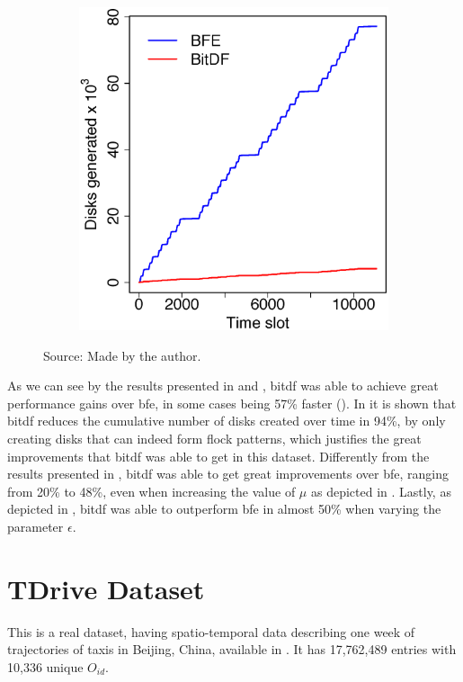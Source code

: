 {\begin{figure}[h!]
\begin{subfigure}[t]{0.48\textwidth}
        \includegraphics[width=\textwidth]{images/BerlinMOD_d.eps}
        \label{fig:berlinmod_disks}
    \end{subfigure}
    \footnotesize{Source: Made by the author.}
    \label{fig:berlinmod_results2}
\end{figure}

As we can see by the results presented in  and , \ac{bitdf}
was able to achieve great performance gains over \ac{bfe}, in some cases being 57\% faster
(). In  it is shown that \ac{bitdf} reduces the cumulative
number of disks created over time in 94\%, by only creating disks that can indeed form flock patterns, which justifies
the great improvements that \ac{bitdf} was able to get in this dataset. Differently from the results presented in
, \ac{bitdf} was able to get great improvements over \ac{bfe}, ranging from 20\% to 48\%, even when
increasing the value of $\mu$ as depicted in . Lastly, as depicted in
, \ac{bitdf} was able to outperform \ac{bfe} in almost 50\% when varying the parameter
$\epsilon$.

\section{TDrive Dataset}
\label{sec:tdrive}
This is a real dataset, having spatio-temporal data describing one week of trajectories of taxis in Beijing, China,
available in \citep{tdrive}. It has 17,762,489 entries with 10,336 unique $O_{id}$.

}

